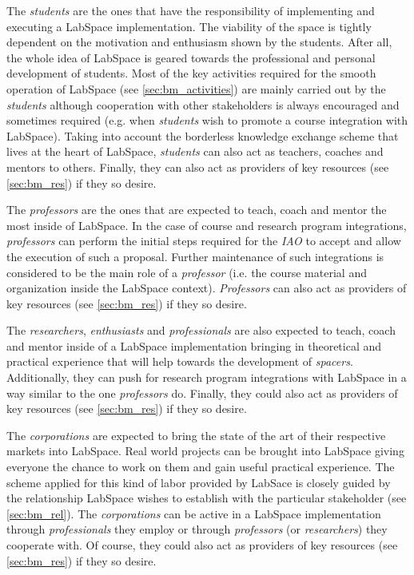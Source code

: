 \documentclass[a4paper, 11pt]{article}
\begin{document}
The \textit{students} are the ones that have the responsibility of implementing and executing a LabSpace implementation. The viability of the space is tightly dependent on the motivation and enthusiasm shown by the students. After all, the whole idea of LabSpace is geared towards the professional and personal development of students. Most of the key activities required for the smooth operation of LabSpace (see \ref{sec:bm_activities}) are mainly carried out by the \textit{students} although cooperation with other stakeholders is always encouraged and sometimes required (e.g. when \textit{students} wish to promote a course integration with LabSpace). Taking into account the borderless knowledge exchange scheme that lives at the heart of LabSpace, \textit{students} can also act as teachers, coaches and mentors to others. Finally, they can also act as providers of key resources (see \ref{sec:bm_res}) if they so desire.

The \textit{professors} are the ones that are expected to teach, coach and mentor the most inside of LabSpace. In the case of course and research program integrations, \textit{professors} can perform the initial steps required for the \textit{IAO} to accept and allow the execution of such a proposal. Further maintenance of such integrations is considered to be the main role of a \textit{professor} (i.e. the course material and organization inside the LabSpace context). \textit{Professors} can also act as providers of key resources (see \ref{sec:bm_res}) if they so desire.

The \textit{researchers}, \textit{enthusiasts} and \textit{professionals} are also expected to teach, coach and mentor inside of a LabSpace implementation bringing in theoretical and practical experience that will help towards the development of \textit{spacers}. Additionally, they can push for research program integrations with LabSpace in a way similar to the one \textit{professors} do. Finally, they could also act as providers of key resources (see \ref{sec:bm_res}) if they so desire.

The \textit{corporations} are expected to bring the state of the art of their respective markets into LabSpace. Real world projects can be brought into LabSpace giving everyone the chance to work on them and gain useful practical experience. The scheme applied for this kind of labor provided by LabSace is closely guided by the relationship LabSpace wishes to establish with the particular stakeholder (see \ref{sec:bm_rel}). The \textit{corporations} can be active in a LabSpace implementation through \textit{professionals} they employ or through \textit{professors} (or \textit{researchers}) they cooperate with. Of course, they could also act as providers of key resources (see \ref{sec:bm_res}) if they so desire.
\end{document}
